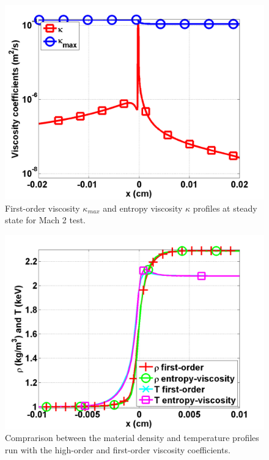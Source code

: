 \documentclass[review]{elsarticle}
\begin{document}
\begin{figure}[H]
                \centering
                \includegraphics[width=\textwidth]{Mach_2_nel_2000_viscosity.png}
        \caption{First-order viscosity $\kappa_{max}$ and entropy viscosity $\kappa$ profiles at steady state for Mach 2 test.}\label{fig:Mach2_viscosity}
\end{figure}
\begin{figure}[H]
                \centering
                \includegraphics[width=\textwidth]{Mach_2_fo_ev.png}
        \caption{Comprarison between the material density and temperature profiles run with the high-order and first-order viscosity coefficients.}\label{fig:Mach2_tempEVandFO}
\end{figure}
\end{document}
